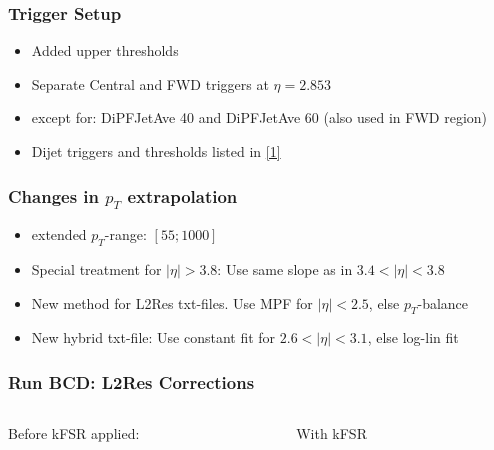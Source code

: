 \documentclass[t,compress]{beamer}
\begin{document}
 
\begin{frame}
  \frametitle{Trigger Setup}
\begin{itemize}
\vspace{1cm}
\item Added upper thresholds
\item Separate Central and FWD triggers at $\eta = 2.853$
\item except for: DiPFJetAve 40 and DiPFJetAve 60 (also used in FWD region)
\item Dijet triggers and thresholds listed in \href{https://docs.google.com/spreadsheets/d/1LXIO3vw8RuMwBFgYUDtLmAghhFvWjs3gALRKlJxzWus/}{[1]}
 \end{itemize}
 \end{frame}
  
  
\begin{frame}
  \frametitle{Changes in $p_T$ extrapolation}
\begin{itemize}
\vspace{1cm}
\item extended $p_T$-range:  $[55; 1000]$
\item Special treatment for $|\eta|>3.8$: Use same slope as in $3.4 < |\eta| < 3.8$  
\item New  method for L2Res txt-files. Use MPF for $|\eta| < 2.5$, else $p_T$-balance
\item New hybrid txt-file: Use constant fit for $2.6 < |\eta| < 3.1$, else log-lin fit
 \end{itemize}
 \end{frame}
  
\begin{frame}
\frametitle{Run BCD: L2Res Corrections}
\vspace{-0.4cm}
\begin{columns}
 \begin{column}{0.5\textwidth}
 \vspace{-0.4cm}
 Before kFSR applied:
  \begin{figure}
\end{figure}
 \end{column}
\begin{column}{0.5\textwidth}
With kFSR
\vspace{-0.4cm}
\begin{figure}
\end{figure}
\vspace{-1cm}
\begin{figure}
\end{figure}
 \end{column}
 \end{columns}
 \end{frame}
\end{document}
